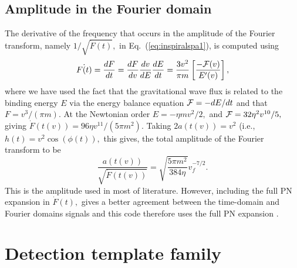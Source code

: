 \subsection{Amplitude in the Fourier domain}
The derivative of the frequency that occurs in the
amplitude of the Fourier transform, namely
$1/\sqrt{\dot{F}(t)},$ in Eq.~(\ref{eq:inspiralspa1}), 
is computed using
\begin{equation}
\dot{F(t)} = \frac{dF}{dt} 
           = \frac{dF}{dv}\frac{dv}{dE}\frac{dE}{dt}
           = \frac{3v^2}{\pi m}\left [\frac{{-\cal F}(v)}{E'(v)} \right ],
\end{equation}
where we have used the fact that the gravitational wave flux
is related to the binding energy $E$ via the energy balance equation
${\cal F} = -dE/dt$ and that $F=v^3/(\pi m).$
At the Newtonian order $E=-\eta m v^2/2,$ and ${\cal F} = 32\eta^2 v^{10}/5,$
giving $\dot{F}(t(v)) = 96\eta v^{11}/(5\pi m^2).$ Taking
$2a(t(v)) = v^2$ (i.e., $h(t) = v^2 \cos (\phi(t)),$ this gives, the 
total amplitude of the Fourier transform to be 
$$\frac{a(t(v))}{\sqrt{\dot{F}(t(v))}} =  \sqrt{\frac{5\pi m^2}{384\eta}} v_f^{-7/2}.$$
This is the amplitude used in most of literature. However, including the
full PN expansion in $\dot{F}(t),$ gives a better agreement between the 
time-domain and Fourier domains signals and this code therefore uses the full
PN expansion \cite{dis2}.

\section{Detection template family}
\label{sec:BCV}

